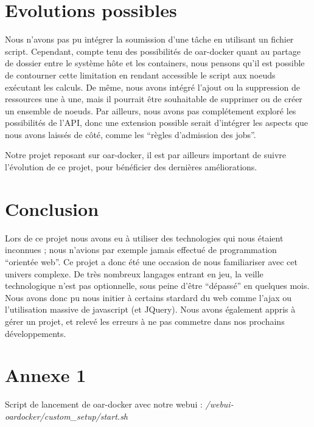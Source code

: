 \documentclass[a4paper,10pt]{article}
\begin{document}
\section{Evolutions possibles}
Nous n'avons pas pu intégrer la soumission d'une tâche en utilisant un fichier script. Cependant, compte tenu des possibilités de oar-docker quant au partage de dossier entre le système hôte et les containers,
nous pensons qu'il est possible de contourner cette limitation en rendant accessible le script aux noeuds exécutant les calculs. De même, nous avons intégré l'ajout ou la suppression de ressources une à une,
mais il pourrait être souhaitable de supprimer ou de créer un ensemble de noeuds. Par ailleurs, nous avons pas complétement exploré les possibilités de l'API, donc une extension possible serait d'intégrer les aspects
que nous avons laissés de côté, comme les ``règles d'admission des jobs''.

Notre projet reposant sur oar-docker, il est par ailleurs important de suivre l'évolution de ce projet, pour bénéficier des dernières améliorations.
\section{Conclusion}
Lors de ce projet nous avons eu à utiliser des technologies qui nous étaient inconnues ; nous n'avions par exemple jamais effectué de programmation ``orientée web''. 
Ce projet a donc été une occasion de nous familiariser avec cet univers complexe. De très nombreux langages entrant en jeu, la veille technologique n'est pas optionnelle,
sous peine d'être ``dépassé'' en quelques mois.
\vspace{0.5cm}
Nous avons donc pu nous initier à certains stardard du web comme l'ajax ou l'utilisation massive de javascript (et JQuery).
Nous avons également appris à gérer un projet, et relevé les erreurs à ne pas commetre dans nos prochains développements.
\newpage
\section{Annexe 1 \label{annexe1}}
Script de lancement de oar-docker avec notre webui :  \textit{/webui-oardocker/custom\_setup/start.sh}
\end{document}
